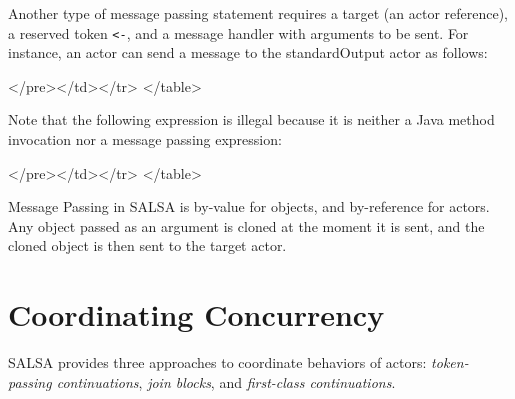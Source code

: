 Another type of message passing statement 
requires a target (an actor reference), 
a reserved token {\tt {\textless}-}, 
and a message handler with arguments to be sent. 
For instance, an actor can send a message to 
the standardOutput actor as follows:
{\singlespace

}
\begin{htmlonly}

 \begin{rawhtml} 
   </pre></td></tr>
  </table>
\end{rawhtml} 
\end{htmlonly} 
 
Note that the following expression is illegal 
because it is neither  
a Java method invocation nor a 
message passing expression:
{\singlespace

}
\begin{htmlonly}

 \begin{rawhtml} 
   </pre></td></tr>
  </table>
\end{rawhtml} 
\end{htmlonly} 

Message Passing in SALSA is by-value 
for objects, and 
by-reference for actors. Any object
passed as an argument is cloned at the moment it 
is sent, and the cloned object is then sent to the target actor.

\section{Coordinating Concurrency}
\label{Coordinating Concurrency}
SALSA provides three approaches to coordinate behaviors of actors: 
\textit{token-passing continuations}, \textit{join blocks}, 
and \textit{first-class continuations}. 

